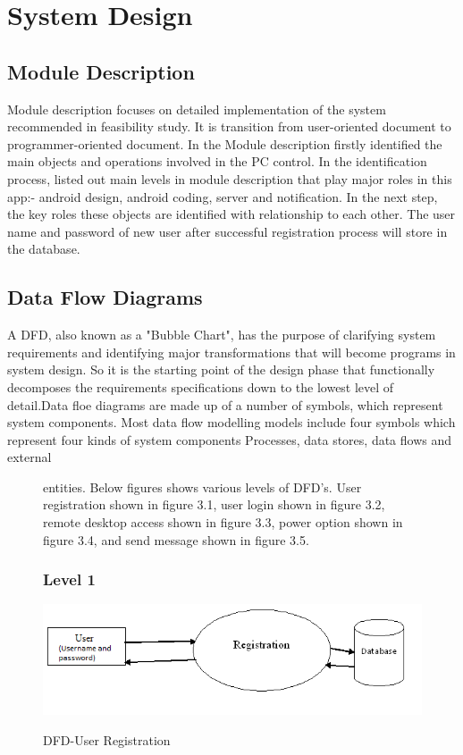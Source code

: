 \chapter{System Design}
\label{System Design}
\section{Module Description}
	Module description focuses on detailed implementation of the system recommended in feasibility study. It is transition from user-oriented document to programmer-oriented document. In the Module description firstly identified the main objects and operations involved in the PC control. In the identification process, listed out main levels in module description that play major roles in this app:- android design, android coding, server and notification.
	In the next step, the key roles these objects are identified with relationship to each other. The user name and password of new user after successful registration process will store in the database. 
\section{Data Flow Diagrams}
\label{Data Flow Diagrams}
	A DFD, also known as a "Bubble Chart", has the purpose of clarifying system requirements and identifying major transformations that will become programs in system design. So it is the starting point of the design phase that functionally decomposes the requirements specifications down to the lowest level of detail.Data floe diagrams are made up of a number of symbols, which represent system components. Most data flow modelling models include four symbols which represent four  kinds of system components Processes, data stores, data flows and external 

\begin{figure}
entities. Below figures shows various levels of DFD's. User registration shown in figure 3.1, user login shown in figure 3.2, remote desktop access shown in figure 3.3, power option shown in figure 3.4, and send message shown in figure 3.5. 
\subsection{Level 1}
\label{Level 1}
\begin{center}
\scalebox{0.70}
{\includegraphics{login1.png}}
\caption{DFD-User Registration}
\end{center}
\end{figure}



